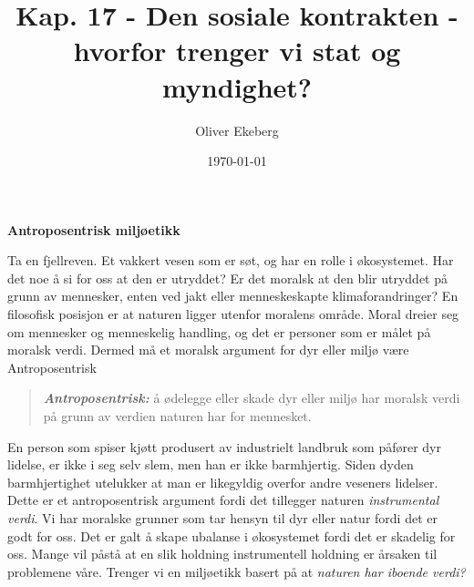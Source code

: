 \documentclass[11pt, a4paper]{article}
\title{Kap. 17 - Den sosiale kontrakten - hvorfor trenger vi stat og myndighet?}
\author{Oliver Ekeberg}
\date{\today}
\newenvironment{sectionbox}[1][]{%
    \begin{sectionboxinner}
    \textbf{\large #1}
    \vspace{1pt}
    \newline
}{%
    \end{sectionboxinner}
}
\begin{document}
\maketitle

\tableofcontents


\begin{sectionbox}[Antroposentrisk miljøetikk]

Ta en fjellreven. Et vakkert vesen som er søt, og har en rolle i økosystemet. Har det noe å si for oss at den er utryddet? Er det moralsk at den blir utryddet på grunn av mennesker, enten ved jakt eller menneskeskapte klimaforandringer? En filosofisk posisjon er at naturen ligger utenfor moralens område. Moral dreier seg om mennesker og menneskelig handling, og det er personer som er målet på moralsk verdi. Dermed må et moralsk argument for dyr eller miljø være Antroposentrisk

\begin{quote}
    \textbf{\textit{Antroposentrisk:}} å ødelegge eller skade dyr eller miljø har moralsk verdi på grunn av verdien naturen har for mennesket.
\end{quote}

En person som spiser kjøtt produsert av industrielt landbruk som påfører dyr lidelse, er ikke i seg selv slem, men han er ikke barmhjertig. Siden dyden barmhjertighet utelukker at man er likegyldig overfor andre veseners lidelser.\\

Dette er et antroposentrisk argument fordi det tillegger naturen \textit{instrumental verdi}. Vi har moralske grunner som tar hensyn til dyr eller natur fordi det er godt for oss. Det er galt å skape ubalanse i økosystemet fordi det er skadelig for oss. Mange vil påstå at en slik holdning instrumentell holdning er årsaken til problemene våre. Trenger vi en miljøetikk basert på at \textit{naturen har iboende verdi?}

\end{sectionbox}
\end{document}
